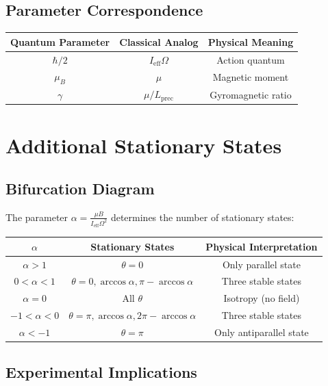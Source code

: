 \documentclass[12pt]{article}
\begin{document}
\subsection{Parameter Correspondence}

\begin{center}
\begin{tabular}{|c|c|c|}
\hline
\textbf{Quantum Parameter} & \textbf{Classical Analog} & \textbf{Physical Meaning} \\
\hline
$\hbar/2$ & $I_{\text{eff}} \Omega$ & Action quantum \\
$\mu_B$ & $\mu$ & Magnetic moment \\
$\gamma$ & $\mu/L_{\text{prec}}$ & Gyromagnetic ratio \\
\hline
\end{tabular}
\end{center}

\section{Additional Stationary States}

\subsection{Bifurcation Diagram}

The parameter $\alpha = \frac{\mu B}{I_{\text{eff}} \Omega^2}$ determines the number of stationary states:

\begin{center}
\begin{tabular}{|c|c|c|}
\hline
$\alpha$ & \textbf{Stationary States} & \textbf{Physical Interpretation} \\
\hline
$\alpha > 1$ & $\theta = 0$ & Only parallel state \\
$0 < \alpha < 1$ & $\theta = 0, \arccos\alpha, \pi - \arccos\alpha$ & Three stable states \\
$\alpha = 0$ & All $\theta$ & Isotropy (no field) \\
$-1 < \alpha < 0$ & $\theta = \pi, \arccos\alpha, 2\pi - \arccos\alpha$ & Three stable states \\
$\alpha < -1$ & $\theta = \pi$ & Only antiparallel state \\
\hline
\end{tabular}
\end{center}

\subsection{Experimental Implications}
\end{document}
